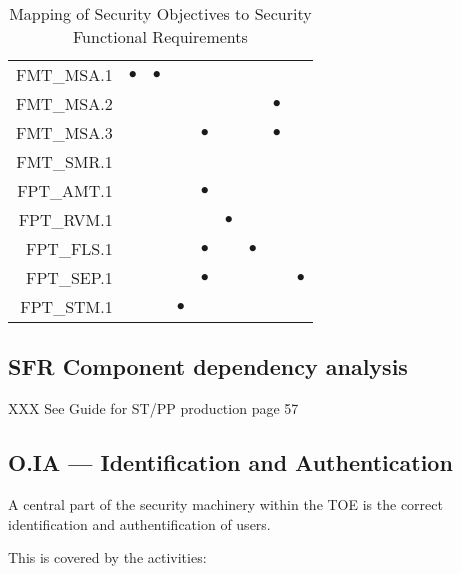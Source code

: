 \documentclass[12pt,english]{scrbook}
\newcommand{\oh}{$\bullet$}
\begin{document}
\begin{table}
\begin{tabular}{rRRRRRRRR}
FMT\_MSA.1                  & \oh  &  \oh         &         &           &          &             &              &              \\
FMT\_MSA.2                  &      &              &         &           &          &             &  \oh         &              \\  
FMT\_MSA.3                  &      &              &         & \oh       &          &             &  \oh         &              \\
FMT\_SMR.1                  &      &              &         &           &          &             &              &              \\
FPT\_AMT.1                  &      &              &         & \oh       &          &             &              &              \\
FPT\_RVM.1                  &      &              &         &           &  \oh     &             &              &              \\
FPT\_FLS.1                  &      &              &         &  \oh      &          &   \oh       &              &              \\
FPT\_SEP.1                  &      &              &         &   \oh     &          &             &              &   \oh        \\
FPT\_STM.1                  &      &              &  \oh    &           &          &             &              &              \\
 \bottomrule
 \end{tabular}
 \caption{Mapping of Security Objectives to Security Functional Requirements}
\end{table}

\subsection{SFR Component dependency analysis}

XXX See Guide for ST/PP production page 57

\subsection{O.IA --- Identification and Authentication}

    A central part of the security machinery within the TOE is the correct
    identification and authentification of users.

    This is covered by the activities:
\end{document}
